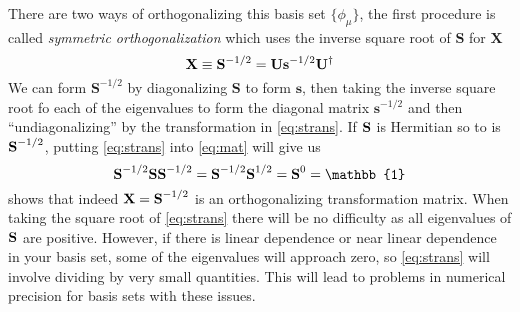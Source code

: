 \documentclass[11pt]{article}
\begin{document}
There are two ways of orthogonalizing this basis set $\{\phi_\mu\}$, the first procedure is called \textit{symmetric orthogonalization} which uses the inverse square root of $\mathbf{S}$ for $\mathbf{X}$
\begin{equation}\label{eq:strans}
\mathbf{X} \equiv \mathbf{S}^{-1/2} = \mathbf{U}\mathbf{s}^{-1/2} \mathbf{U}^\dagger
\end{equation}
We can form $\mathbf{S}^{-1/2}$ by diagonalizing $\mathbf{S}$ to form $\mathbf{s}$, then taking the inverse square root fo each of the eigenvalues to form the diagonal matrix $\mathbf{s}^{-1/2}$ and then ``undiagonalizing'' by the transformation in \eqref{eq:strans}. If $\textbf{S}$ is Hermitian so to is $\textbf{S}^{-1/2}$, putting \eqref{eq:strans} into \eqref{eq:mat} will give us 
\begin{equation}\label{key}
\bb{S}^{-1/2}\bb{S}\bb{S}^{-1/2} = \bb{S}^{-1/2}\bb{S}^{1/2} = \bb{S}^0 = \mathbb{1} 
\end{equation}
shows that indeed $\textbf{X} = \textbf{S}^{-1/2}$ is an orthogonalizing transformation matrix. When taking the square root of \eqref{eq:strans} there will be no difficulty as all eigenvalues of $\textbf{S}$ are positive. However, if there is linear dependence or near linear dependence in your basis set, some of the eigenvalues will approach zero, so \eqref{eq:strans} will involve dividing by very small quantities. This will lead to problems in numerical precision for basis sets with these issues. 
\end{document}
